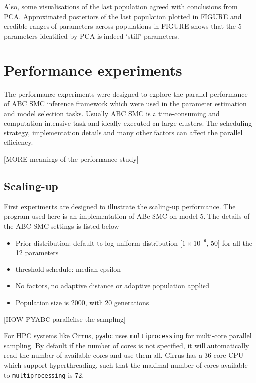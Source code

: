 \documentclass[12pt,a4paper]{report}
\begin{document}
Also, some visualisations of the last population agreed with conclusions from PCA. Approximated posteriors of the last population plotted in FIGURE and credible ranges of parameters across populations in FIGURE shows that the 5 parameters identified by PCA is indeed `stiff' parameters.












\chapter{Performance experiments}

The performance experiments were designed to explore the parallel performance of ABC SMC inference framework which were used in the parameter estimation and model selection tasks. Usually ABC SMC is a time-consuming and computation intensive task and ideally executed on large clusters. The scheduling strategy, implementation details and many other factors can affect the parallel efficiency.

    [MORE meanings of the performance study]

\section{Scaling-up}

First experiments are designed to illustrate the scaling-up performance. The program used here is an implementation of ABc SMC on model 5. The details of the ABC SMC settings is listed below

\begin{itemize}
    \item Prior distribution: default to log-uniform distribution [$1\times 10^{-6}$, 50] for all the 12 parameters
    \item threshold schedule: median epsilon
    \item No factors, no adaptive distance or adaptive population applied
    \item Population size is 2000, with 20 generations
\end{itemize}

[HOW PYABC parallelise the sampling]

For HPC systems like Cirrus, \verb|pyabc| uses \verb|multiprocessing| for multi-core parallel sampling. By default if the number of cores is not specified, it will automatically read the number of available cores and use them all. Cirrus has a 36-core CPU which support hyperthreading, such that the maximal number of cores available to \verb|multiprocessing| is 72.
\end{document}
